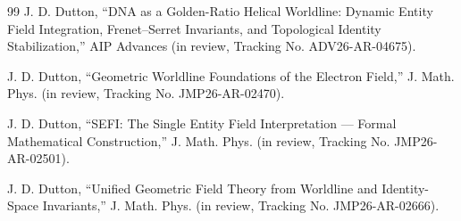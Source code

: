 \documentclass[aip,adv,reprint]{revtex4-2}
\begin{document}
\begin{thebibliography}{99}
J. D. Dutton,
``DNA as a Golden-Ratio Helical Worldline: Dynamic Entity Field Integration,
Frenet–Serret Invariants, and Topological Identity Stabilization,''
AIP Advances (in review, Tracking No. ADV26-AR-04675).

J. D. Dutton,
``Geometric Worldline Foundations of the Electron Field,''
J. Math. Phys. (in review, Tracking No. JMP26-AR-02470).

J. D. Dutton,
``SEFI: The Single Entity Field Interpretation — Formal Mathematical Construction,''
J. Math. Phys. (in review, Tracking No. JMP26-AR-02501).

J. D. Dutton,
``Unified Geometric Field Theory from Worldline and Identity-Space Invariants,''
J. Math. Phys. (in review, Tracking No. JMP26-AR-02666).

\end{thebibliography}
\end{document}
